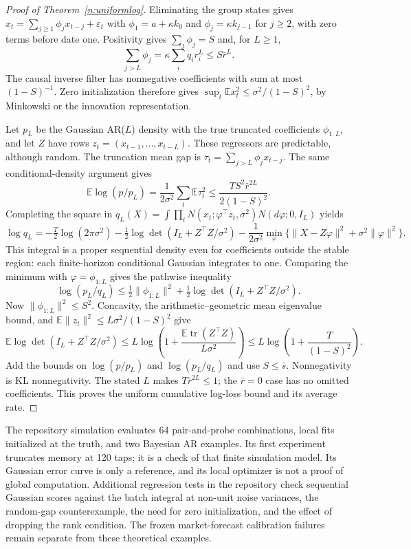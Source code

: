 \documentclass[12pt]{article}
\theoremstyle{definition}
\theoremstyle{remark}
\begin{document}
\begin{proof}[Proof of Theorem~\ref{n:uniformlog}]
Eliminating the group states gives $x_t=\sum_{j\ge1}\phi_jx_{t-j}+\varepsilon_t$ with $\phi_1=a+\kappa k_0$ and $\phi_j=\kappa k_{j-1}$ for $j\ge2$, with zero terms before date one. Positivity gives $\sum_j\phi_j=S$ and, for $L\ge1$,
\[
\sum_{j>L}\phi_j=\kappa\sum_iq_ir_i^L\le S\bar r^L.
\]
The causal inverse filter has nonnegative coefficients with sum at most $(1-S)^{-1}$. Zero initialization therefore gives $\sup_t\mathbb E x_t^2\le\sigma^2/(1-S)^2$, by Minkowski or the innovation representation.

Let $p_L$ be the Gaussian AR($L$) density with the true truncated coefficients $\phi_{1:L}$, and let $Z$ have rows $z_t=(x_{t-1},\ldots,x_{t-L})$. These regressors are predictable, although random. The truncation mean gap is $\tau_t=\sum_{j>L}\phi_jx_{t-j}$. The same conditional-density argument gives
\[
\mathbb E\log(p/p_L)=\frac1{2\sigma^2}\sum_t\mathbb E\tau_t^2
\le\frac{TS^2\bar r^{2L}}{2(1-S)^2}.
\]
Completing the square in $q_L(X)=\int\prod_t N(x_t;\varphi^\top z_t,\sigma^2)N(d\varphi;0,I_L)$ yields
\[
\log q_L=-\tfrac T2\log(2\pi\sigma^2)-\tfrac12\log\det(I_L+Z^\top Z/\sigma^2)
-\frac1{2\sigma^2}\min_\varphi\{\|X-Z\varphi\|^2+\sigma^2\|\varphi\|^2\}.
\]
This integral is a proper sequential density even for coefficients outside the stable region: each finite-horizon conditional Gaussian integrates to one. Comparing the minimum with $\varphi=\phi_{1:L}$ gives the pathwise inequality
\[
\log(p_L/q_L)\le\tfrac12\|\phi_{1:L}\|^2+\tfrac12\log\det(I_L+Z^\top Z/\sigma^2).
\]
Now $\|\phi_{1:L}\|^2\le S^2$. Concavity, the arithmetic--geometric mean eigenvalue bound, and $\mathbb E\|z_t\|^2\le L\sigma^2/(1-S)^2$ give
\[
\mathbb E\log\det(I_L+Z^\top Z/\sigma^2)
\le L\log\left(1+\frac{\mathbb E\operatorname{tr}(Z^\top Z)}{L\sigma^2}\right)
\le L\log\left(1+\frac{T}{(1-S)^2}\right).
\]
Add the bounds on $\log(p/p_L)$ and $\log(p_L/q_L)$ and use $S\le\bar s$. Nonnegativity is KL nonnegativity. The stated $L$ makes $T\bar r^{2L}\le1$; the $\bar r=0$ case has no omitted coefficients. This proves the uniform cumulative log-loss bound and its average rate.
\end{proof}

The repository simulation evaluates 64 pair-and-probe combinations, local fits initialized at the truth, and two Bayesian AR examples. Its first experiment truncates memory at 120 taps; it is a check of that finite simulation model. Its Gaussian error curve is only a reference, and its local optimizer is not a proof of global computation. Additional regression tests in the repository check sequential Gaussian scores against the batch integral at non-unit noise variances, the random-gap counterexample, the need for zero initialization, and the effect of dropping the rank condition. The frozen market-forecast calibration failures remain separate from these theoretical examples.
\end{document}
